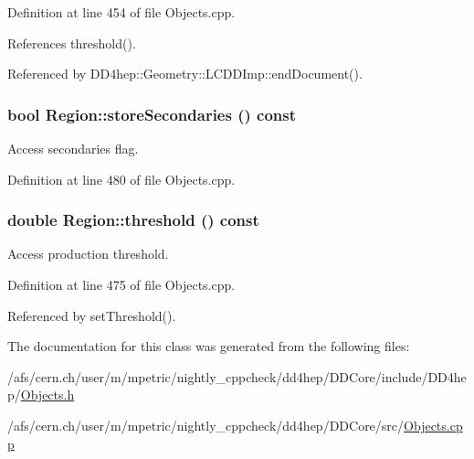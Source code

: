 Definition at line 454 of file Objects.cpp.

References threshold().

Referenced by DD4hep::Geometry::LCDDImp::endDocument().\hypertarget{class_d_d4hep_1_1_geometry_1_1_region_a1f08466c4f3e0135dd3aaf8684aae623}{
\subsubsection[{storeSecondaries}]{\setlength{\rightskip}{0pt plus 5cm}bool Region::storeSecondaries () const}}
\label{class_d_d4hep_1_1_geometry_1_1_region_a1f08466c4f3e0135dd3aaf8684aae623}


Access secondaries flag. 

Definition at line 480 of file Objects.cpp.\hypertarget{class_d_d4hep_1_1_geometry_1_1_region_a4fee8a2258250ccb8e17c72964d2eaf7}{
\subsubsection[{threshold}]{\setlength{\rightskip}{0pt plus 5cm}double Region::threshold () const}}
\label{class_d_d4hep_1_1_geometry_1_1_region_a4fee8a2258250ccb8e17c72964d2eaf7}


Access production threshold. 

Definition at line 475 of file Objects.cpp.

Referenced by setThreshold().

The documentation for this class was generated from the following files:\begin{DoxyCompactItemize}
\item 
/afs/cern.ch/user/m/mpetric/nightly\_\-cppcheck/dd4hep/DDCore/include/DD4hep/\hyperlink{_objects_8h}{Objects.h}\item 
/afs/cern.ch/user/m/mpetric/nightly\_\-cppcheck/dd4hep/DDCore/src/\hyperlink{_objects_8cpp}{Objects.cpp}\end{DoxyCompactItemize}
